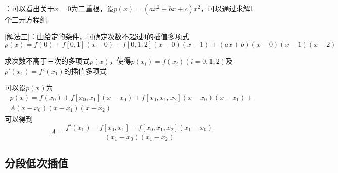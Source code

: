 \begin{example}
\begin{solution}
        [解法二]：可以看出关于$x = 0$为二重根，设$p(x) = (ax^2+bx+c)x^2$，可以通过求解1个三元方程组

        [解法三]：由给定的条件，可确定次数不超过4的插值多项式
        \[
            p(x) = f(0) + f[0,1](x-0) + f[0,1,2](x-0)(x-1) + (ax+b)(x-0)(x-1)(x-2)
        \]
    \end{solution}
\end{example}

\begin{example}
    求次数不高于三次的多项式$p(x)$，使得$p(x_i) = f(x_i)(i = 0,1,2)$及$p'(x_1) = f'(x_1)$的插值多项式
    
    \begin{solution}
        可以设$p(x)$为
        \[
            \begin{array}{l}
                p(x) = f(x_0) + f[x_0,x_1](x-x_0) + f[x_0,x_1,x_2](x-x_0)(x-x_1) + \\
                A(x-x_0)(x-x_1)(x-x_2)
            \end{array}
        \]
        可以得到
        \[
            A = \dfrac{f'(x_1)-f[x_0,x_1]-f[x_0,x_1,x_2](x_1-x_0)}{(x_1-x_0)(x_1-x_2)}
        \]
    \end{solution}
\end{example}

\subsection{分段低次插值}
